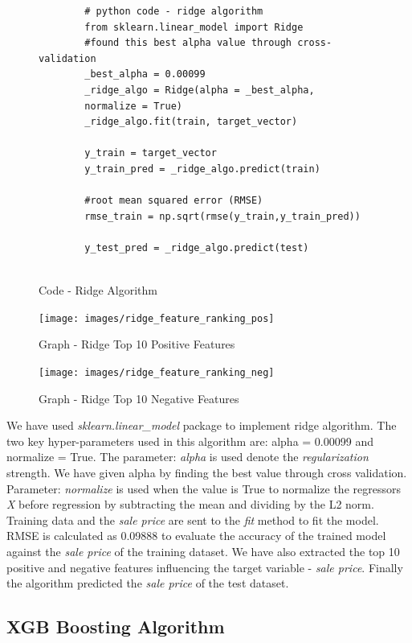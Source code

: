 \documentclass[sigconf]{acmart}
\begin{document}
	\begin{figure}[htb]
		\begin{verbatim}
		# python code - ridge algorithm
		from sklearn.linear_model import Ridge
		#found this best alpha value through cross-validation
		_best_alpha = 0.00099	
		_ridge_algo = Ridge(alpha = _best_alpha, 
		normalize = True)	               	
		_ridge_algo.fit(train, target_vector)
		
		y_train = target_vector
		y_train_pred = _ridge_algo.predict(train)
		
		#root mean squared error (RMSE)
		rmse_train = np.sqrt(rmse(y_train,y_train_pred))	
		
		y_test_pred = _ridge_algo.predict(test)	
		
		\end{verbatim}
		\caption{Code - Ridge Algorithm} \label{c:ridge} 
	\end{figure}
	
	\begin{figure}[htb]
		\centering
		\texttt{[image: images/ridge\_feature\_ranking\_pos]}	
		\caption{Graph - Ridge Top 10 Positive Features} \label{fig:ridge-feature-ranking-pos} 
	\end{figure}
	
	\begin{figure}[htb]
		\centering
		\texttt{[image: images/ridge\_feature\_ranking\_neg]}	
		\caption{Graph - Ridge Top 10 Negative Features} \label{fig:ridge-feature-ranking-neg} 
	\end{figure}
	
	We have used {\em sklearn.linear\_model} package to implement ridge algorithm. The two key hyper-parameters used in this algorithm are: alpha = 0.00099 and normalize = True. The parameter: {\em alpha} is used  denote the {\em regularization} strength. We have given alpha by finding the best value through cross validation. Parameter: {\em normalize} is used when the value is True to normalize the regressors {\em X} before regression by subtracting the mean and dividing by the L2 norm.  Training data and the {\em sale price} are sent to the {\em fit} method to fit the model. RMSE is calculated as 0.09888 to evaluate the accuracy of the trained model against the {\em sale price} of the training dataset. We have also extracted the top 10 positive and negative features influencing the target variable - {\em sale price}. Finally the algorithm predicted the {\em sale price} of the test dataset. 
	
	\subsection{XGB Boosting Algorithm}
	
\end{document}
